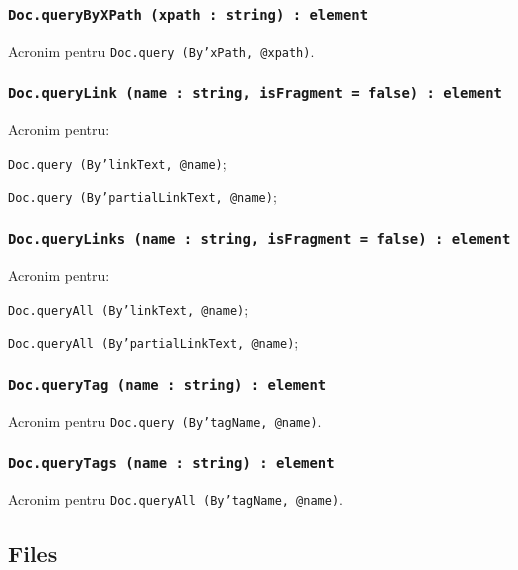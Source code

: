 \subsubsection{\texttt{Doc.queryByXPath (xpath : string) : element}}

Acronim pentru \texttt{Doc.query (By'xPath, @xpath)}.

\subsubsection{\texttt{Doc.queryLink (name : string, isFragment = false) : element}}

Acronim pentru:
\begin{icItems}
	\item \texttt{Doc.query (By'linkText, @name)};
	\item \texttt{Doc.query (By'partialLinkText, @name)};
\end{icItems}

\subsubsection{\texttt{Doc.queryLinks (name : string, isFragment = false) : element}}

Acronim pentru:
\begin{icItems}
	\item \texttt{Doc.queryAll (By'linkText, @name)};
	\item \texttt{Doc.queryAll (By'partialLinkText, @name)};
\end{icItems}

\subsubsection{\texttt{Doc.queryTag (name : string) : element}}

Acronim pentru \texttt{Doc.query (By'tagName, @name)}.

\subsubsection{\texttt{Doc.queryTags (name : string) : element}}

Acronim pentru \texttt{Doc.queryAll (By'tagName, @name)}.

\subsection{{\color{orange} Files}}

